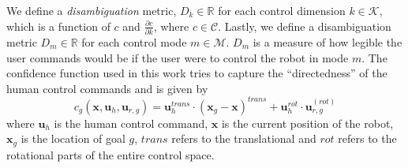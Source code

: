 \documentclass[conference]{IEEEtran}
\newcommand{\norm}[1]{\left\lVert#1\right\rVert}
\begin{document}
We define a \textit{disambiguation} metric, $D_{k}\in \mathbb{R}$ for each control dimension $k \in \mathcal{K}$, which is a function of $c$ and $\frac{\partial c}{\partial k}$, where $c \in \mathcal{C}$. Lastly, we define a disambiguation metric $D_m \in \mathbb{R}$ for each control mode $m \in \mathcal{M}$.
$D_m$ is a measure of how legible the user commands would be if the user were to control the robot in mode $m$. 
The confidence function used in this work tries to capture the ``directedness'' of the human control commands and is given by 
\begin{equation*}\label{E1}
c_g(\boldsymbol{x}, \boldsymbol{u}_h, \boldsymbol{u}_{r,g}) = \boldsymbol{u}_{h}^{trans}\cdot(\boldsymbol{x}_{g} - \boldsymbol{x})^{trans} + \boldsymbol{u}_h^{rot}\cdot\boldsymbol{u}_{r,g}^{(rot)}
\end{equation*}
where $\boldsymbol{u}_h$ is the human control command,  $\boldsymbol{x}$ is the current position of the robot, $\boldsymbol{x}_{g}$ is the location of goal $g$, $trans$ refers to the translational and $rot$ refers to the rotational parts of the entire control space. 
\end{document}
